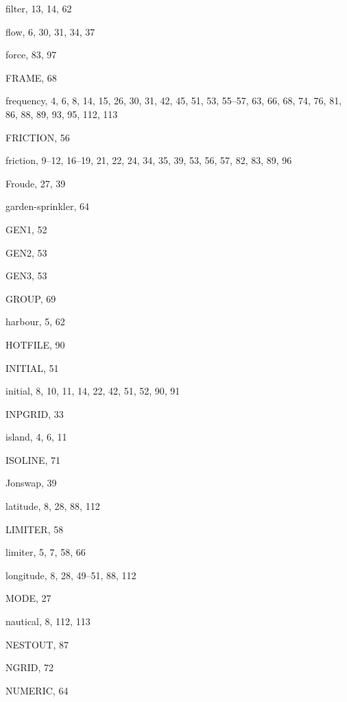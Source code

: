 \documentclass[12pt]{book}
\begin{document}
\begin{theindex}
  \indexspace

  \item filter, 13, 14, 62
  \item flow, 6, 30, 31, 34, 37
  \item force, 83, 97
  \item FRAME, 68
  \item frequency, 4, 6, 8, 14, 15, 26, 30, 31, 42, 45, 51, 53, 55--57,
		63, 66, 68, 74, 76, 81, 86, 88, 89, 93, 95, 112, 113
  \item FRICTION, 56
  \item friction, 9--12, 16--19, 21, 22, 24, 34, 35, 39, 53, 56, 57,
		82, 83, 89, 96
  \item Froude, 27, 39

  \indexspace

  \item garden-sprinkler, 64
  \item GEN1, 52
  \item GEN2, 53
  \item GEN3, 53
  \item GROUP, 69

  \indexspace

  \item harbour, 5, 62
  \item HOTFILE, 90

  \indexspace

  \item INITIAL, 51
  \item initial, 8, 10, 11, 14, 22, 42, 51, 52, 90, 91
  \item INPGRID, 33
  \item island, 4, 6, 11
  \item ISOLINE, 71

  \indexspace

  \item Jonswap, 39

  \indexspace

  \item latitude, 8, 28, 88, 112
  \item LIMITER, 58
  \item limiter, 5, 7, 58, 66
  \item longitude, 8, 28, 49--51, 88, 112

  \indexspace

  \item MODE, 27

  \indexspace

  \item nautical, 8, 112, 113
  \item NESTOUT, 87
  \item NGRID, 72
  \item NUMERIC, 64


\end{theindex}
\end{document}
